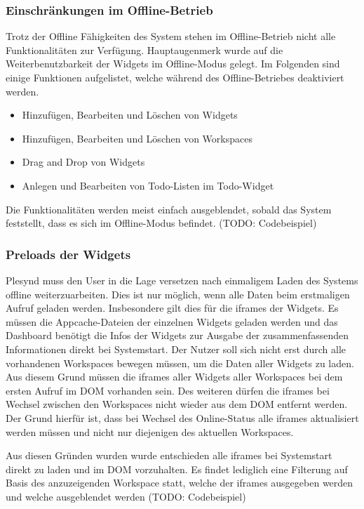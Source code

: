 \subsubsection{Einschränkungen im Offline-Betrieb}
Trotz der Offline Fähigkeiten des System stehen im Offline-Betrieb nicht alle Funktionalitäten zur Verfügung. Hauptaugenmerk wurde auf die Weiterbenutzbarkeit der Widgets im Offline-Modus gelegt. Im Folgenden sind einige Funktionen aufgelistet, welche während des Offline-Betriebes deaktiviert werden.
\begin{itemize}
 \item Hinzufügen, Bearbeiten und Löschen von Widgets
 \item Hinzufügen, Bearbeiten und Löschen von Workspaces
 \item Drag and Drop von Widgets
 \item Anlegen und Bearbeiten von Todo-Listen im Todo-Widget
 
\end{itemize}
Die Funktionalitäten werden meist einfach ausgeblendet, sobald das System feststellt, dass es sich im Offline-Modus befindet.
(TODO: Codebeispiel)

\subsubsection{Preloads der Widgets}
Plesynd muss den User in die Lage versetzen nach einmaligem Laden des Systems offline weiterzuarbeiten. Dies ist nur möglich, wenn alle Daten beim erstmaligen Aufruf geladen werden. Insbesondere gilt dies für die iframes der Widgets. Es müssen die Appcache-Dateien der einzelnen Widgets geladen werden und das Dashboard benötigt die Infos der Widgets zur Ausgabe der zusammenfassenden Informationen direkt bei Systemstart. Der Nutzer soll sich nicht erst durch alle vorhandenen Workspaces bewegen müssen, um die Daten aller Widgets zu laden. Aus diesem Grund müssen die iframes aller Widgets aller Workspaces bei dem ersten Aufruf im DOM vorhanden sein. Des weiteren dürfen die iframes bei Wechsel zwischen den Workspaces nicht wieder aus dem DOM entfernt werden. Der Grund hierfür ist, dass bei Wechsel des Online-Status alle iframes aktualisiert werden müssen und nicht nur diejenigen des aktuellen Workspaces.

Aus diesen Gründen wurden wurde entschieden alle iframes bei Systemstart direkt zu laden und im DOM vorzuhalten. Es findet lediglich eine Filterung auf Basis des anzuzeigenden Workspace statt, welche der iframes ausgegeben werden und welche ausgeblendet werden
(TODO: Codebeispiel)

